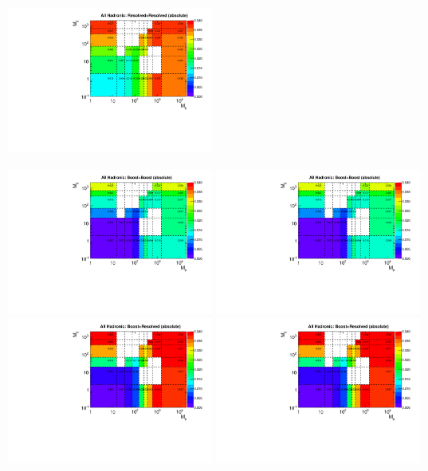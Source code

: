\begin{figure}[htbp]
  \includegraphics[width=0.48\textwidth]{figures/ttDM_PS_allhad_2D_R08_rr.pdf}
  \caption{}
  \label{fig:hadronic_acc08}
\end{figure}

\begin{figure}[htbp]
  \centering
  \includegraphics[width=0.48\textwidth]{figures/ttDM_S_allhad_2D_R15_bb.pdf}
  \includegraphics[width=0.48\textwidth]{figures/ttDM_PS_allhad_2D_R15_bb.pdf} \\
  \includegraphics[width=0.48\textwidth]{figures/ttDM_S_allhad_2D_R15_br.pdf}
  \includegraphics[width=0.48\textwidth]{figures/ttDM_PS_allhad_2D_R15_br.pdf} \\

\end{figure}

